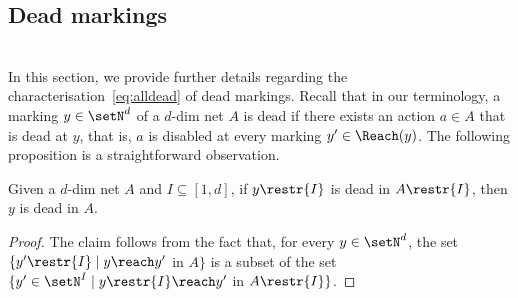 \subsection{Dead markings}\label{subsec:dead}
\hfill\\

In this section, we provide further details regarding the
characterisation~\eqref{eq:alldead} of dead markings.
Recall that in our terminology, a marking $y\in\setN^d$ of a $d$-dim net $A$
is dead if there exists an action $a\in A$ that is dead at $y$, that is,
$a$ is disabled at every marking $y'\in\Reach(y)$. The following
proposition is a straightforward observation.
\begin{prop}\label{prop:restrdead}
	Given a $d$-dim net $A$ and $I\subseteq [1,d]$, if 
 $y\restr{I}$ is dead in $A\restr{I}$, then $y$ is dead in $A$.
\end{prop}
\begin{proof}
The claim follows from the fact that, for every $y\in\setN^d$, the set
$\{y'\restr{I}\mid y\reach y'$ in $A\}$ is a subset of the set
$\{y'\in\setN^I\mid y\restr{I}\reach y'$ in $A\restr{I}\}$.
\end{proof}

